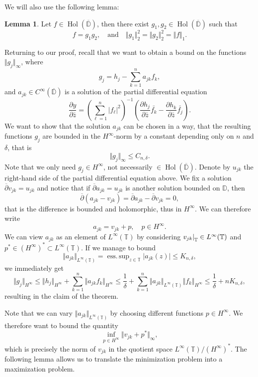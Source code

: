\documentclass[letterpaper, 11pt]{article}
\newcommand{\D}{\mathbb{D}}
\newcommand{\T}{\mathbb{T}}
\newcommand{\1}{\mathds{1}}
\newcommand{\cl}[1]{\overline{#1}}
\newcommand{\restr}[2]{{%
  \left.\kern-\nulldelimiterspace %
  #1 %
  \littletaller %
  \right|_{#2} %
  }}
\newcommand{\littletaller}{\mathchoice{\vphantom{\big|}}{}{}{}}
\newcommand{\Wirtzbar}[1][]{\frac{\partial #1}{\partial \bar{z}}}
\newcommand{\wirtzbar}{\overline{\partial}}
\DeclareMathOperator*{\Hol}{Hol}
\DeclareMathOperator*{\esssup}{ess.\,sup}
\theoremstyle{definition}
\newtheorem{lemma}[theorem]{Lemma}
\newenvironment{innerproof}
 {\renewcommand{\qedsymbol}{}\proof}
 {\endproof}
\begin{document}
We will also use the following lemma:

\begin{lemma} \label{lem:factorisation}
  Let $f \in \Hol(\cl{\D})$, then there exist $g_1, g_2 \in \Hol(\cl{\D})$ such that
  $$ f = g_1 g_2, \quad \textrm{and} \quad \Vert g_1 \Vert_2^2 = \Vert g_2 \Vert_2^2 = \Vert f \Vert_1. $$
\end{lemma}

\begin{innerproof}[Proof (continued)]
  Returning to our proof, recall that we want to obtain a bound on the functions $\Vert g_j \Vert_\infty$, where
  $$ g_j = h_j - \sum_{k=1}^n a_{jk} f_k, $$
  and $a_{jk} \in C^\infty(\cl{\D})$ is a solution of the partial differential equation
  $$ \Wirtzbar[y] = \left( \sum_{\ell=1}^n \vert f_\ell \vert^2 \right)^{-1} \left( \Wirtzbar[h_j] \bar{f_k} - \Wirtzbar[h_k] \bar{f_j} \right). $$
  We want to show that the solution $a_{jk}$ can be chosen in a way, that the resulting functions $g_j$ are bounded in the $H^\infty$-norm by a constant depending only on $n$ and $\delta$, that is
  $$ \Vert g_j \Vert_\infty \leq C_{n, \delta}. $$
  Note that we only need $g_j \in H^\infty$, not necessarily $\in \Hol(\cl{\D})$. Denote by $u_{jk}$ the right-hand side of the partial differential equation above. We fix a solution $\wirtzbar v_{jk} = u_{jk}$ and notice that if $\wirtzbar a_{jk} = u_{jk}$ is another solution bounded on $\D$, then
  $$ \wirtzbar (a_{jk} - v_{jk}) = \wirtzbar a_{jk} - \wirtzbar v_{jk} = 0, $$
  that is the difference is bounded and holomorphic, thus in $H^\infty$. We can therefore write
  $$ a_{jk} = v_{jk} + p, \quad p \in H^\infty. $$
  We can view $a_{jk}$ as an element of $L^\infty(\T)$ by considering $\restr{v_{jk}}{\T} \in L^\infty(\T)$ and $p^* \in (H^\infty)^* \subset L^\infty(\T)$. If we manage to bound
  $$ \Vert a_{jk} \Vert_{L^\infty(\T)} = \esssup_{z \in \T} \vert a_{jk}(z) \vert \leq K_{n,\delta}, $$
  we immediately get
  $$ \Vert g_j \Vert_{H^\infty} \leq \Vert h_j \Vert_{H^\infty} + \sum_{k=1}^n \Vert a_{jk} f_k \Vert_{H^\infty} \leq \frac{1}{\delta} + \sum_{k=1}^n \Vert a_{jk} \Vert_{L^\infty(\T)} \Vert f_k \Vert_{H^\infty} \leq \frac{1}{\delta} + n K_{n, \delta}, $$
  resulting in the claim of the theorem.

  Note that we can vary $\Vert a_{jk} \Vert_{L^\infty(\T)}$ by choosing different functions $p \in H^\infty$. We therefore want to bound the quantity
  $$ \inf_{p \in H^\infty} \Vert v_{jk} + p^* \Vert_\infty, $$
  which is precisely the norm of $v_{jk}$ in the quotient space $L^\infty(\T) / (H^\infty)^*$. The following lemma allows us to translate the minimization problem into a maximization problem.
\end{innerproof}
\end{document}
